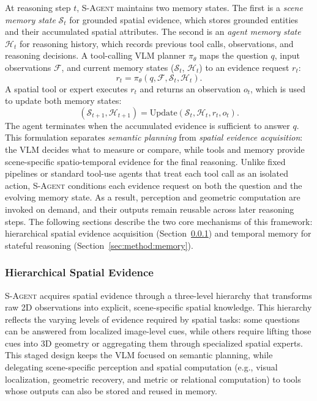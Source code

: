 At reasoning step $t$, \textsc{S-Agent} maintains two memory states. The first is a \emph{scene memory state} $\mathcal{S}_t$ for grounded spatial evidence, which stores grounded entities and their accumulated spatial attributes. The second is an \emph{agent memory state} $\mathcal{H}_t$ for reasoning history, which records previous tool calls, observations, and reasoning decisions. 
A tool-calling VLM planner $\pi_{\theta}$ maps the question $q$, input observations $\mathcal{F}$, and current memory states ($\mathcal{S}_t$, $\mathcal{H}_t$) to an evidence request $r_t$:
\[
    r_t = \pi_{\theta}(q, \mathcal{F}, \mathcal{S}_t, \mathcal{H}_t).
\]
A spatial tool or expert executes $r_t$ and returns an observation $o_t$, which is used to update both memory states:
\[
    (\mathcal{S}_{t+1}, \mathcal{H}_{t+1}) =
    \mathrm{Update}(\mathcal{S}_t, \mathcal{H}_t, r_t, o_t).
\]
The agent terminates when the accumulated evidence is sufficient to answer $q$. This formulation separates \emph{semantic planning} from \emph{spatial evidence acquisition}: the VLM decides what to measure or compare, while tools and memory provide scene-specific spatio-temporal evidence for the final reasoning.
Unlike fixed pipelines or standard tool-use agents that treat each tool call as an isolated action, \textsc{S-Agent} conditions each evidence request on both the question and the evolving memory state. 
As a result, perception and geometric computation are invoked on demand, and their outputs remain reusable across later reasoning steps. 
The following sections describe the two core mechanisms of this framework: hierarchical spatial evidence acquisition (Section~\ref{sec:method:spatial}) and temporal memory for stateful reasoning (Section~\ref{sec:method:memory}).

\subsubsection{Hierarchical Spatial Evidence}
\label{sec:method:spatial}

\textsc{S-Agent} acquires spatial evidence through a three-level hierarchy that transforms raw 2D observations into explicit, scene-specific spatial knowledge. 
% 
This hierarchy reflects the varying levels of evidence required by spatial tasks: some questions can be answered from localized image-level cues, while others require lifting those cues into 3D geometry or aggregating them through specialized spatial experts. 
% 
This staged design keeps the VLM focused on semantic planning, while delegating scene-specific perception and spatial computation (e.g., visual localization, geometric recovery, and metric or relational computation) to tools whose outputs can also be stored and reused in memory.

